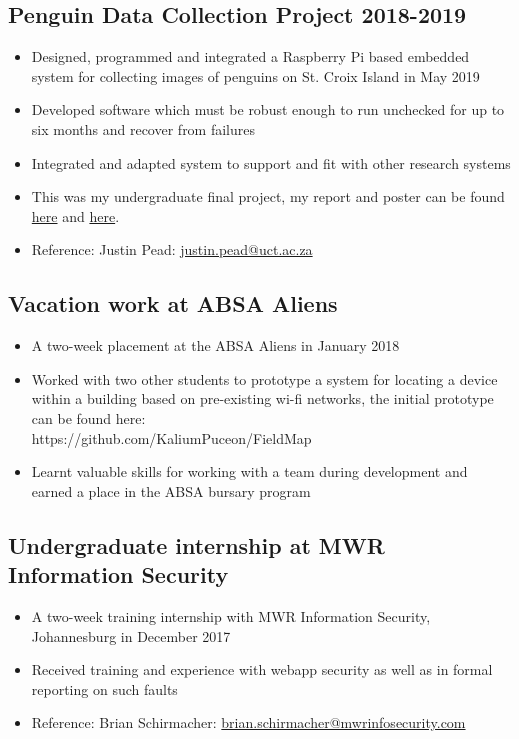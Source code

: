 \documentclass[10pt,a4paper,notitlepage]{article}
\begin{document}
\subsection*{Penguin Data Collection Project 2018-2019}
\begin{itemize}
	\setlength\itemsep{0.02em}
    \item Designed, programmed and integrated a Raspberry Pi based embedded system for collecting images of penguins on St. Croix Island in May 2019
    \item Developed software which must be robust enough to run unchecked for up to six months and recover from failures
    \item Integrated and adapted system to support and fit with other research systems
    \item This was my undergraduate final project, my report and poster can be found \href{https://awful.cloud/upl/thesis.pdf}{here} and \href{https://awful.cloud/upl/poster.pdf}{here}.
    \item Reference: Justin Pead: \href{mailto:justin.pead@uct.ac.za}{justin.pead@uct.ac.za}
\end{itemize}

\subsection*{Vacation work at ABSA Aliens}
\begin{itemize}
	\setlength\itemsep{0.02em}
    \item A two-week placement at the ABSA Aliens in January 2018
    \item Worked with two other students to prototype a system for locating a device within a building based on pre-existing wi-fi networks, the initial prototype can be found here:\\https://github.com/KaliumPuceon/FieldMap
    \item Learnt valuable skills for working with a team during development and earned a place in the ABSA bursary program
\end{itemize}

\subsection*{Undergraduate internship at MWR Information Security}
\begin{itemize}
	\setlength\itemsep{0.02em}
    \item A two-week training internship with MWR Information Security, Johannesburg in December 2017
    \item Received training and experience with webapp security as well as in formal reporting on such faults
    \item Reference: Brian Schirmacher: \href{mailto:brian.schirmacher@mwrinfosecurity.com}{brian.schirmacher@mwrinfosecurity.com}
\end{itemize}
\end{document}
